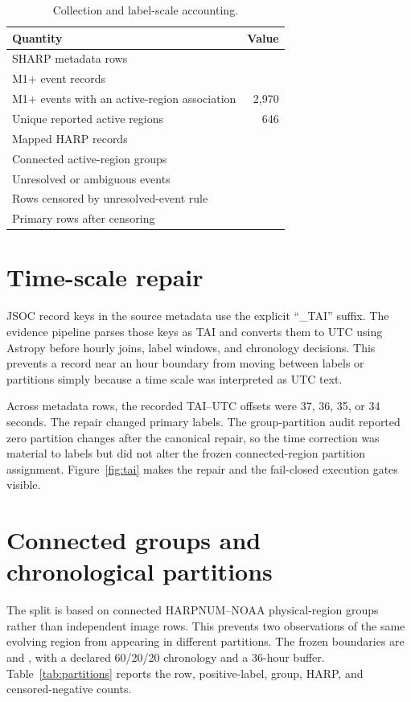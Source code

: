 \documentclass[11pt,oneside]{report}
\begin{document}
\begin{table}[H]
\centering
\caption{Collection and label-scale accounting.}
\label{tab:scale}
\begin{tabular}{lr}
\toprule
Quantity & Value \\
\midrule
SHARP metadata rows & \ManifestCount{} \\
M1+ event records & \MOneEvents{} \\
M1+ events with an active-region association & 2,970 \\
Unique reported active regions & 646 \\
Mapped HARP records & \MappedHarps{} \\
Connected active-region groups & \GroupCount{} \\
Unresolved or ambiguous events & \UnresolvedEvents{} \\
Rows censored by unresolved-event rule & \CensoredRows{} \\
Primary rows after censoring & \PrimaryCount{} \\
\bottomrule
\end{tabular}
\end{table}

\section{Time-scale repair}

JSOC record keys in the source metadata use the explicit ``\_TAI'' suffix. The evidence pipeline parses those keys as TAI and converts them to UTC using Astropy before hourly joins, label windows, and chronology decisions. This prevents a record near an hour boundary from moving between labels or partitions simply because a time scale was interpreted as UTC text.

Across \TaiRows{} metadata rows, the recorded TAI--UTC offsets were 37, 36, 35, or 34 seconds. The repair changed \TaiLabelChanges{} primary labels. The group-partition audit reported zero partition changes after the canonical repair, so the time correction was material to labels but did not alter the frozen connected-region partition assignment. Figure~\ref{fig:tai} makes the repair and the fail-closed execution gates visible.

\section{Connected groups and chronological partitions}

The split is based on connected HARPNUM--NOAA physical-region groups rather than independent image rows. This prevents two observations of the same evolving region from appearing in different partitions. The frozen boundaries are \BoundaryOne{} and \BoundaryTwo{}, with a declared 60/20/20 chronology and a 36-hour buffer. Table~\ref{tab:partitions} reports the row, positive-label, group, HARP, and censored-negative counts.
\end{document}
